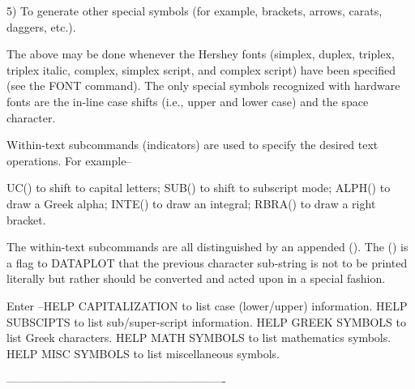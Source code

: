    5) To generate other special symbols (for example, brackets,
      arrows, carats, daggers, etc.).
 
The above may be done whenever the Hershey fonts (simplex, duplex,
triplex, triplex italic, complex, simplex script, and complex script)
have been specified (see the FONT command).  The only special symbols
recognized with hardware fonts are the in-line case shifts (i.e., upper
and lower case) and the space character.
 
Within-text subcommands (indicators) are used to specify the desired
text operations.  For example--
 
   UC()   to shift to capital letters;
   SUB()  to shift to subscript mode;
   ALPH() to draw a Greek alpha;
   INTE() to draw an integral;
   RBRA() to draw a right bracket.
 
The within-text subcommands are all distinguished by an appended ().
The () is a flag to DATAPLOT that the previous character sub-string is
not to be printed literally but rather should be converted and acted
upon in a special fashion.
 
Enter   --HELP CAPITALIZATION to list case (lower/upper) information.
          HELP SUBSCIPTS to list sub/super-script information.
          HELP GREEK SYMBOLS to list Greek characters.
          HELP MATH SYMBOLS to list mathematics symbols.
          HELP MISC SYMBOLS to list miscellaneous symbols.
 
----------------------------------------------------------
 
 
 
 
 
 
 
 
 
 
 
 
 
 
 
 
 
 
 
 
 
 
 
 
 
 
 
 
 
 
 
 
 
 
 
 
 
 
 
 
 
 
 
 






